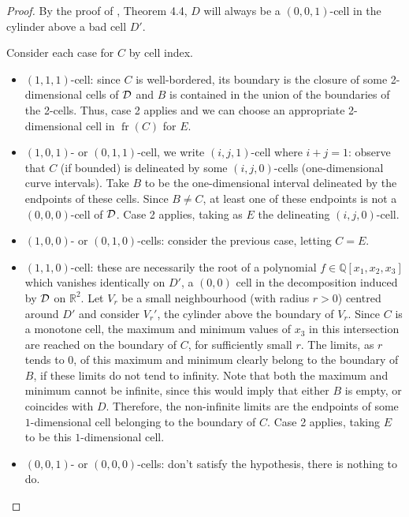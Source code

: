\documentclass[
]{book}
\theoremstyle{definition}
\theoremstyle{definition}
\theoremstyle{definition}
\theoremstyle{definition}
\theoremstyle{remark}
\begin{document}
\begin{proof}

By the proof of \citet{lazard10}, Theorem 4.4, \(D\) will always be a \((0,0,1)\)-cell in the cylinder above a bad cell \(D'\).

Consider each case for \(C\) by cell index.

\begin{itemize}
\item
  \((1,1,1)\)-cell: since \(C\) is well-bordered, its boundary is the closure of some 2-dimensional cells of \(\cal D\) and \(B\) is contained in the union of the boundaries of the 2-cells. Thus, case 2 applies and we can choose an appropriate 2-dimensional cell in \({\operatorname{fr} \left( C \right)}\) for \(E\).
\item
  \((1,0,1)\)- or \((0,1,1)\)-cell, we write \((i,j,1)\)-cell where \(i+j=1\): observe that \(C\) (if bounded) is delineated by some \((i,j,0)\)-cells (one-dimensional curve intervals). Take \(B\) to be the one-dimensional interval delineated by the endpoints of these cells. Since \(B \neq C\), at least one of these endpoints is not a \((0,0,0)\)-cell of \(\cal D\). Case 2 applies, taking as \(E\) the delineating \((i,j,0)\)-cell.
\item
  \((1,0,0)\)- or \((0,1,0)\)-cells: consider the previous case, letting \(C = E\).
\item
  \((1,1,0)\)-cell: these are necessarily the root of a polynomial \(f \in \mathbb{Q}[x_1,x_2,x_3]\) which vanishes identically on \(D'\), a \((0,0)\) cell in the decomposition induced by \(\cal D\) on \(\mathbb{R}^2\).
  Let \(V_r\) be a small neighbourhood (with radius \(r > 0\)) centred around \(D'\) and consider \(V_r'\), the cylinder above the boundary of \(V_r\). Since \(C\) is a monotone cell, the maximum and minimum values of \(x_3\) in this intersection are reached on the boundary of \(C\), for sufficiently small \(r\). The limits, as \(r\) tends to \(0\), of this maximum and minimum clearly belong to the boundary of \(B\), if these limits do not tend to infinity. Note that both the maximum and minimum cannot be infinite, since this would imply that either \(B\) is empty, or coincides with \(D\). Therefore, the non-infinite limits are the endpoints of some \(1\)-dimensional cell belonging to the boundary of \(C\). Case 2 applies, taking \(E\) to be this \(1\)-dimensional cell.
\item
  \((0,0,1)\)- or \((0,0,0)\)-cells: don't satisfy the hypothesis, there is nothing to do.
\end{itemize}

\end{proof}
\end{document}
